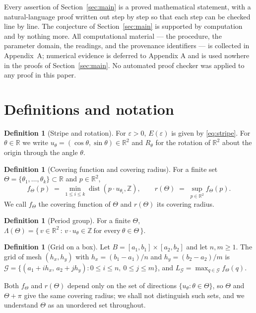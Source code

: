 \documentclass[11pt]{article}
\theoremstyle{plain}
\theoremstyle{definition}
\newtheorem{definition}[theorem]{Definition}
\theoremstyle{remark}
\newcommand{\dZ}{\operatorname{dist}}
\newcommand{\R}{\mathbb{R}}
\newcommand{\Z}{\mathbb{Z}}
\begin{document}
Every assertion of Section~\ref{sec:main} is a proved mathematical statement, with a natural-language
proof written out step by step so that each step can be checked line by line. The conjecture of
Section~\ref{sec:main} is supported by computation and by nothing more. All computational material ---
the procedure, the parameter domain, the readings, and the provenance identifiers --- is collected in
Appendix~A; numerical evidence is deferred to Appendix A and is used nowhere in the proofs of
Section~\ref{sec:main}. No automated proof checker was applied to any proof in this paper.

\section{Definitions and notation}
\label{sec:defs}

\begin{definition}[Stripe and rotation]
\label{def:stripe}
For $\varepsilon>0$, $E(\varepsilon)$ is given by \eqref{eq:stripe}. For $\theta\in\R$ we write
$u_\theta=(\cos\theta,\sin\theta)\in\R^2$ and $R_\theta$ for the rotation of $\R^2$ about the origin
through the angle $\theta$.
\end{definition}

\begin{definition}[Covering function and covering radius]
\label{def:r}
For a finite set $\Theta=\{\theta_1,\dots,\theta_k\}\subset\R$ and $p\in\R^2$,
\[
f_\Theta(p)\;=\;\min_{1\le i\le k}\dZ(p\cdot u_{\theta_i},\Z),
\qquad
r(\Theta)\;=\;\sup_{p\in\R^2}f_\Theta(p).
\]
We call $f_\Theta$ the covering function of $\Theta$ and $r(\Theta)$ its covering radius.
\end{definition}

\begin{definition}[Period group]
\label{def:period}
For a finite $\Theta$,
$\Lambda(\Theta)=\{\,v\in\R^2\,:\,v\cdot u_\theta\in\Z\ \text{for every}\ \theta\in\Theta\,\}$.
\end{definition}

\begin{definition}[Grid on a box]
\label{def:grid}
Let $B=[a_1,b_1]\times[a_2,b_2]$ and let $n,m\ge1$. The grid of mesh $(h_x,h_y)$ with
$h_x=(b_1-a_1)/n$ and $h_y=(b_2-a_2)/m$ is
$\mathcal{G}=\{(a_1+ih_x,\,a_2+jh_y) : 0\le i\le n,\ 0\le j\le m\}$, and
$L_{\mathcal{G}}=\max_{q\in\mathcal{G}}f_\Theta(q)$.
\end{definition}

Both $f_\Theta$ and $r(\Theta)$ depend only on the set of directions $\{u_\theta:\theta\in\Theta\}$, so
$\Theta$ and $\Theta+\pi$ give the same covering radius; we shall not distinguish such sets, and we
understand $\Theta$ as an unordered set throughout.
\end{document}
